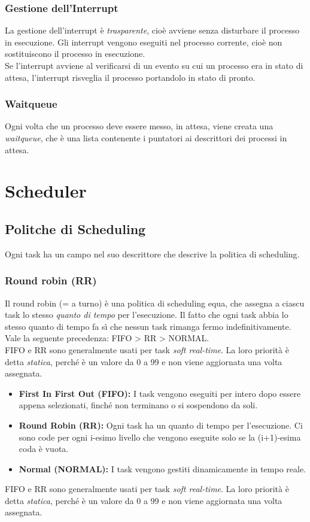 \documentclass[10pt,a4paper]{article}
\begin{document}
\subsubsection{Gestione dell'Interrupt}
La gestione dell'interrupt è \emph{trasparente}, cioè avviene senza disturbare il processo in esecuzione. Gli interrupt vengono eseguiti nel processo corrente, cioè non sostituiscono il processo in esecuzione.\\
Se l'interrupt avviene al verificarsi di un evento su cui un processo era in stato di attesa, l'interrupt risveglia il processo portandolo in stato di pronto.

\subsubsection{Waitqueue}
Ogni volta che un processo deve essere messo, in attesa, viene creata una \emph{waitqueue}, che è una lista contenente i puntatori ai descrittori dei processi in attesa.

\section{Scheduler}

\subsection{Politche di Scheduling}
Ogni task ha un campo nel suo descrittore che descrive la politica di scheduling.

\subsubsection{Round robin (RR)}
Il round robin (= a turno) è una politica di scheduling equa, che assegna a ciascu task lo stesso \emph{quanto di tempo} per l'esecuzione. Il fatto che ogni task abbia lo stesso quanto di tempo fa sì che nessun task rimanga fermo indefinitivamente.\\
Vale la seguente precedenza: FIFO > RR > NORMAL.\\
FIFO e RR sono generalmente usati per task \emph{soft real-time}. La loro priorità è detta \emph{statica}, perché è un valore da 0 a 99 e non viene aggiornata una volta assegnata.
\begin{itemize}
    \item \textbf{First In First Out (FIFO):}
    I task vengono eseguiti per intero dopo essere appena selezionati, finché non terminano o si sospendono da soli.
    \item \textbf{Round Robin (RR):} Ogni task ha un quanto di tempo per l'esecuzione. Ci sono code per ogni i-esimo livello che vengono eseguite solo se la (i+1)-esima coda è vuota.
    \item \textbf{Normal (NORMAL):} I task vengono gestiti dinamicamente in tempo reale.
\end{itemize}
FIFO e RR sono generalmente usati per task \emph{soft real-time}. La loro priorità è detta \emph{statica}, perché è un valore da 0 a 99 e non viene aggiornata una volta assegnata.
\end{document}
